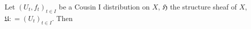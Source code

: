 Let $(U_t, f_t)_{t \in I}$ be a Cousin I distribution on $X$, $\mathfrak{H}$ the structure sheaf of $X$, $\mathfrak{U}: = (U_t)_{t \in I}$. Then
